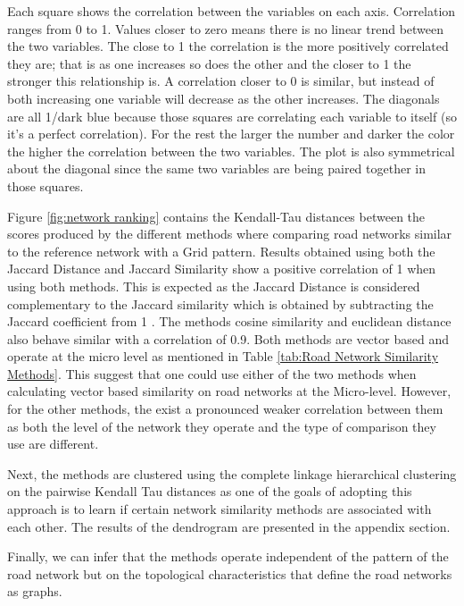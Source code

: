 Each square shows the correlation between the variables on each axis. Correlation ranges from 0 to 1. Values closer to zero means there is no linear trend between the two variables. The close to 1 the correlation is the more positively correlated they are; that is as one increases so does the other and the closer to 1 the stronger this relationship is. A correlation closer to 0 is similar, but instead of both increasing one variable will decrease as the other increases. The diagonals are all 1/dark blue because those squares are correlating each variable to itself (so it's a perfect correlation). For the rest the larger the number and darker the color the higher the correlation between the two variables. The plot is also symmetrical about the diagonal since the same two variables are being paired together in those squares.

Figure \ref{fig:network ranking} contains the Kendall-Tau distances between the scores produced by the different methods where comparing road networks similar to the reference network with a Grid pattern. Results obtained using both the Jaccard Distance and Jaccard Similarity show a positive correlation of 1 when using both methods. This is expected as the Jaccard Distance is considered complementary to the Jaccard similarity which is obtained by subtracting the Jaccard coefficient from 1 . The methods cosine similarity and euclidean distance also behave similar with a correlation of 0.9. Both methods are vector based and operate at the micro level as mentioned in Table \ref{tab:Road Network Similarity Methods}. This suggest that one could use either of the two methods when calculating vector based similarity on road networks at the Micro-level. However, for the other methods, the exist a pronounced weaker correlation between them as both the level of the network they operate and the type of comparison they use are different. 

Next, the methods are clustered using the complete linkage hierarchical clustering on the pairwise Kendall Tau distances as one of the goals of adopting this approach is to learn if certain network similarity methods are associated with each other. The results of the dendrogram are presented in the appendix section.

Finally, we can infer that the methods operate independent of the pattern of the road network but on the topological characteristics that define the road networks as graphs.


